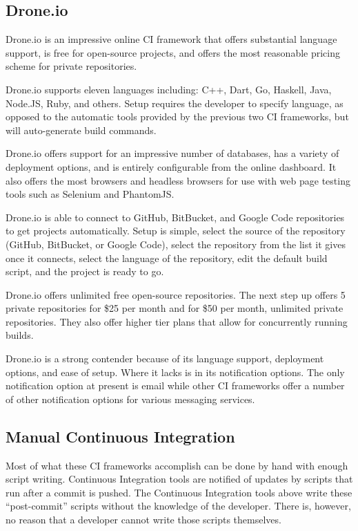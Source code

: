 \documentclass[12pt]{ucthesis}
\begin{document}
\subsection{Drone.io}
Drone.io \cite{DroneIO} is an impressive online CI framework that offers substantial language support, is free for open-source projects, and offers the most reasonable pricing scheme for private repositories.

Drone.io supports eleven languages including: C++, Dart, Go, Haskell, Java, Node.JS, Ruby, and others. Setup requires the developer to specify language, as opposed to the automatic tools provided by the previous two CI frameworks, but will auto-generate build commands.

Drone.io offers support for an impressive number of databases, has a variety of deployment options, and is entirely configurable from the online dashboard. It also offers the most browsers and headless browsers for use with web page testing tools such as Selenium and PhantomJS.

Drone.io is able to connect to GitHub, BitBucket, and Google Code repositories to get projects automatically. Setup is simple, select the source of the repository (GitHub, BitBucket, or Google Code), select the repository from the list it gives once it connects, select the language of the repository, edit the default build script, and the project is ready to go.

Drone.io offers unlimited free open-source repositories. The next step up offers 5 private repositories for \$25 per month and for \$50 per month, unlimited private repositories. They also offer higher tier plans that allow for concurrently running builds.

Drone.io is a strong contender because of its language support, deployment options, and ease of setup. Where it lacks is in its notification options. The only notification option at present is email while other CI frameworks offer a number of other notification options for various messaging services.

\subsection{Manual Continuous Integration}
Most of what these CI frameworks accomplish can be done by hand with enough script writing. Continuous Integration tools are notified of updates by scripts that run after a commit is pushed. The Continuous Integration tools above write these ``post-commit'' scripts without the knowledge of the developer. There is, however, no reason that a developer cannot write those scripts themselves.
\end{document}
